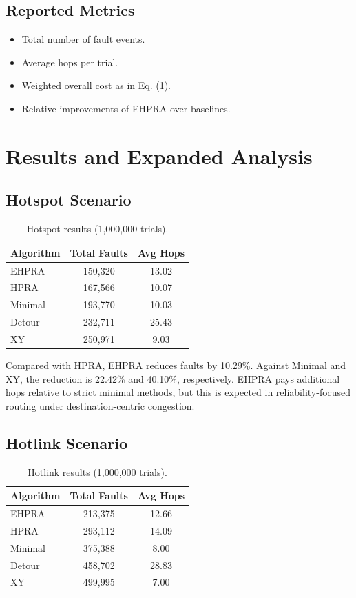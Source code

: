 \documentclass[10pt,a4paper]{article}
\begin{document}
\subsection{Reported Metrics}
\begin{itemize}[leftmargin=6mm]
    \item Total number of fault events.
    \item Average hops per trial.
    \item Weighted overall cost as in Eq. (1).
    \item Relative improvements of EHPRA over baselines.
\end{itemize}

\section{Results and Expanded Analysis}
\subsection{Hotspot Scenario}
\begin{table}[H]
\centering
\caption{Hotspot results (1,000,000 trials).}
\begin{tabular}{lcc}
\toprule
Algorithm & Total Faults & Avg Hops \\
\midrule
EHPRA & 150,320 & 13.02 \\
HPRA & 167,566 & 10.07 \\
Minimal & 193,770 & 10.03 \\
Detour & 232,711 & 25.43 \\
XY & 250,971 & 9.03 \\
\bottomrule
\end{tabular}
\end{table}

Compared with HPRA, EHPRA reduces faults by 10.29\%. Against Minimal and XY, the reduction is 22.42\% and 40.10\%, respectively. EHPRA pays additional hops relative to strict minimal methods, but this is expected in reliability-focused routing under destination-centric congestion.

\subsection{Hotlink Scenario}
\begin{table}[H]
\centering
\caption{Hotlink results (1,000,000 trials).}
\begin{tabular}{lcc}
\toprule
Algorithm & Total Faults & Avg Hops \\
\midrule
EHPRA & 213,375 & 12.66 \\
HPRA & 293,112 & 14.09 \\
Minimal & 375,388 & 8.00 \\
Detour & 458,702 & 28.83 \\
XY & 499,995 & 7.00 \\
\bottomrule
\end{tabular}
\end{table}
\end{document}
